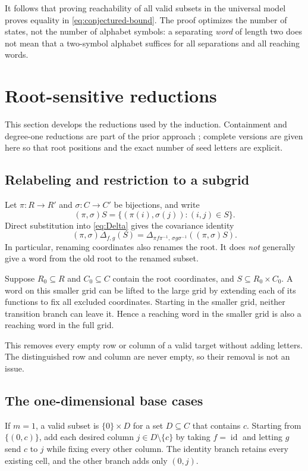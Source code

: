 \documentclass[11pt,letterpaper]{article}
\numberwithin{equation}{section}
\theoremstyle{definition}
\theoremstyle{remark}
\newcommand{\id}{\operatorname{id}}
\begin{document}
It follows that proving reachability of all valid subsets in the universal
model proves equality in \eqref{eq:conjectured-bound}. The proof optimizes
the number of states, not the number of alphabet symbols: a separating
\emph{word} of length two does not mean that a two-symbol alphabet suffices
for all separations and all reaching words.

\section{Root-sensitive reductions}
\label{sec:reductions}
This section develops the reductions used by the induction. Containment
and degree-one reductions are part of the prior approach
\cite[Lemmas~8--9]{BJLRS2016}; complete versions are given here so that root
positions and the exact number of seed letters are explicit.

\subsection{Relabeling and restriction to a subgrid}
Let $\pi:R\to R'$ and $\sigma:C\to C'$ be bijections, and write
\[
 (\pi,\sigma)S=\{(\pi(i),\sigma(j)):(i,j)\in S\}.
\]
Direct substitution into \eqref{eq:Delta} gives the covariance identity
\begin{equation}\label{eq:covariance}
 (\pi,\sigma)\Delta_{f,g}(S)
 =\Delta_{\pi f\pi^{-1},\,\sigma g\sigma^{-1}}
       ((\pi,\sigma)S).
\end{equation}
In particular, renaming coordinates also renames the root. It does
\emph{not} generally give a word from the old root to the renamed subset.

Suppose $R_0\subseteq R$ and $C_0\subseteq C$ contain the root coordinates,
and $S\subseteq R_0\times C_0$. A word on this smaller grid can be lifted
to the large grid by extending each of its functions to fix all excluded
coordinates. Starting in the smaller grid, neither transition branch can
leave it. Hence a reaching word in the smaller grid is also a reaching
word in the full grid.

This removes every empty row or column of a valid target without adding
letters. The distinguished row and column are never empty, so their
removal is not an issue.

\subsection{The one-dimensional base cases}
If $m=1$, a valid subset is $\{0\}\times D$ for a set $D\subseteq C$ that
contains $c$. Starting from $\{(0,c)\}$, add each desired column
$j\in D\setminus\{c\}$ by taking $f=\id$ and letting $g$ send $c$ to $j$
while fixing every other column. The identity branch retains every existing
cell, and the other branch adds only $(0,j)$.
\end{document}
